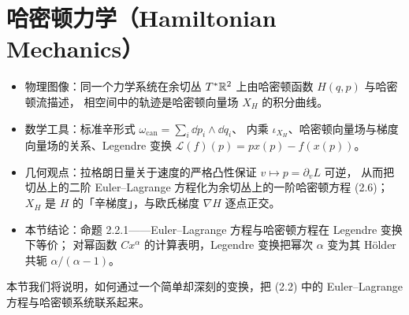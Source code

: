 \section{哈密顿力学（Hamiltonian Mechanics）}

\begin{keytakeaways}
\begin{itemize}
  \item 物理图像：同一个力学系统在余切丛 $T^*\mathbb{R}^2$ 上由哈密顿函数 $H(q,p)$ 与哈密顿流描述，
        相空间中的轨迹是哈密顿向量场 $X_H$ 的积分曲线。
  \item 数学工具：标准辛形式 $\omega_{\mathrm{can}}=\sum_i\dd p_i\wedge\dd q_i$、
        内乘 $\iota_{X_H}$、哈密顿向量场与梯度向量场的关系、Legendre 变换
        $\mathcal{L}(f)(p)=px(p)-f(x(p))$。
  \item 几何观点：拉格朗日量关于速度的严格凸性保证 $v\mapsto p=\partial_vL$ 可逆，
        从而把切丛上的二阶 Euler--Lagrange 方程化为余切丛上的一阶哈密顿方程 (2.6)；
        $X_H$ 是 $H$ 的「辛梯度」，与欧氏梯度 $\nabla H$ 逐点正交。
  \item 本节结论：命题 2.2.1——Euler--Lagrange 方程与哈密顿方程在 Legendre 变换下等价；
        对幂函数 $Cx^\alpha$ 的计算表明，Legendre 变换把幂次 $\alpha$ 变为其 Hölder 共轭
        $\alpha/(\alpha-1)$。
\end{itemize}
\end{keytakeaways}

本节我们将说明，如何通过一个简单却深刻的变换，把 (2.2) 中的 Euler--Lagrange 方程与哈密顿系统联系起来。

